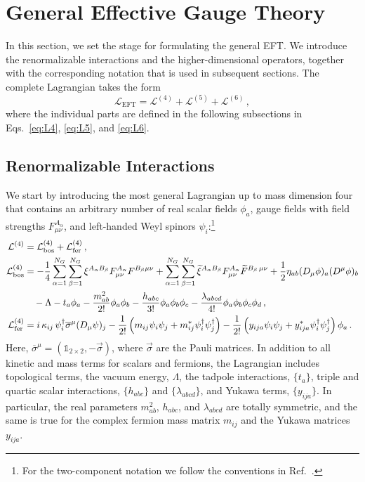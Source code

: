 \section{General Effective Gauge Theory}
\label{sec:EFT}

In this section, we set the stage for formulating the general EFT. 
We introduce the renormalizable
interactions and the higher-dimensional operators, together with the corresponding notation that is used in subsequent sections.
The complete Lagrangian takes the form
\begin{equation}\label{eq:fullEFT}
    \mathcal{L}_{\text{EFT}} = \mathcal{L}^{(4)}+\mathcal{L}^{(5)}+\mathcal{L}^{(6)}\,, 
\end{equation}
where the individual parts are defined in the following subsections in Eqs.~\eqref{eq:L4}, \eqref{eq:L5}, and \eqref{eq:L6}.


\subsection{Renormalizable Interactions}

We start by introducing the most general Lagrangian up to mass dimension four that contains an arbitrary number of real scalar fields $\phi_a$, gauge fields with field strengths $F_{\mu\nu}^{A_\alpha}$, and left-handed Weyl spinors $\psi_i$:\footnote{For the two-component notation we follow the conventions in Ref.~\cite{Dreiner:2008tw}.}
\begin{align}\label{eq:L4}
\mathcal{L}^{(4)} &=  \mathcal{L}^{(4)}_{\text{bos}} + \mathcal{L}^{(4)}_{\text{fer}}\,,\\
    \mathcal{L}^{(4)}_{\text{bos}} &= -\frac{1}{4}\sum_{\alpha=1}^{N_G}\sum_{\beta=1}^{N_G}\xi^{A_\alpha B_\beta} F^{A_\alpha}_{\mu\nu}F^{{B_\beta}\mu\nu}+ \sum_{\alpha=1}^{N_G}\sum_{\beta=1}^{N_G} \widetilde{\xi}^{A_\alpha B_\beta} F^{A_\alpha}_{\mu\nu}\widetilde{F}^{{B_\beta}\,\mu\nu}  + \frac{1}{2} \eta_{ab} (D_\mu\phi)_{a}(D^\mu\phi)_b\nonumber\\
    &\quad -\Lambda-t_a \phi_a-\frac{m^2_{ab}}{2!}\phi_{a}\phi_{b}-\frac{h_{abc}}{3!}\phi_a \phi_b\phi_c
    -\frac{\lambda_{abcd}}{4!}\phi_{a}\phi_{b}\phi_{c}\phi_{d}\,,\\
    \mathcal{L}^{(4)}_{\text{fer}} &= i\, \kappa_{ij}\,  \psi^\dagger_i \overline{\sigma}^\mu (D_\mu \psi)_j - \frac{1}{2!}\left (m_{ij} \psi_i \psi_j + m_{ij}^* \psi_i^\dagger \psi_j^\dagger \right) - \frac{1}{2!}\left (y_{ija} \psi_i \psi_j + y_{ija}^* \psi_i^\dagger \psi_j^\dagger \right)\phi_a  \,.
\end{align}
Here, $\overline \sigma^\mu = (\mathbb{1}_{2\times 2}, -\vec \sigma)$, where $\vec \sigma$ are the Pauli matrices.
%
In addition to all kinetic and mass terms for scalars and fermions, the Lagrangian includes topological terms, the vacuum energy, $\Lambda$, the tadpole interactions, $\{t_a\}$, triple and quartic scalar interactions, $\{h_{abc}\}$ and $\{\lambda_{abcd}\}$, and Yukawa terms, $\{y_{ija}\}$. In particular, the real parameters $m^2_{ab}$, $h_{abc}$, and $\lambda_{abcd}$ are totally symmetric, and the same is true for the complex fermion mass matrix $m_{ij}$ and the Yukawa matrices $y_{ija}$.

